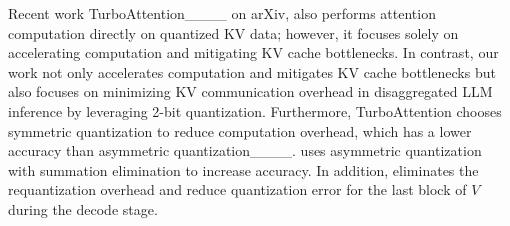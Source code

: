 Recent work TurboAttention____ on arXiv, also performs attention computation directly on quantized KV data; however, it focuses solely on accelerating computation and mitigating KV cache bottlenecks. In contrast, our work not only accelerates computation and mitigates KV cache bottlenecks but also focuses on minimizing KV communication overhead in disaggregated LLM inference by leveraging 2-bit quantization.
Furthermore, TurboAttention chooses symmetric quantization to reduce computation overhead, which has a lower accuracy than asymmetric quantization____. \sys uses asymmetric quantization with summation elimination to increase accuracy. In addition, \sys eliminates the requantization overhead and reduce quantization error for the last block of $V$ during the decode stage.




